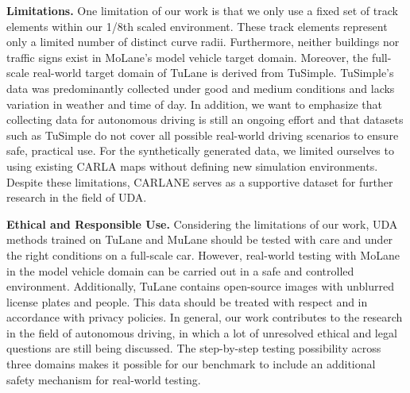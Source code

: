 \documentclass{article}
\begin{document}
	\textbf{Limitations.} One limitation of our work is that we only use a fixed set of track elements within our 1/8th scaled environment. These track elements represent only a limited number of distinct curve radii. Furthermore, neither buildings nor traffic signs exist in MoLane's model vehicle target domain.
	Moreover, the full-scale real-world target domain of TuLane is derived from TuSimple. TuSimple's data was predominantly collected under good and medium conditions and lacks variation in weather and time of day. In addition, we want to emphasize that collecting data for autonomous driving is still an ongoing effort and that datasets such as TuSimple do not cover all possible real-world driving scenarios to ensure safe, practical use. For the synthetically generated data, we limited ourselves to using existing CARLA maps without defining new simulation environments. Despite these limitations, CARLANE serves as a supportive dataset for further research in the field of UDA.
	\vspace{-2pt}
	
	\textbf{Ethical and Responsible Use.} Considering the limitations of our work, UDA methods trained on TuLane and MuLane should be tested with care and under the right conditions on a full-scale car. However, real-world testing with MoLane in the model vehicle domain can be carried out in a safe and controlled environment. Additionally, TuLane contains open-source images with unblurred license plates and people. This data should be treated with respect and in accordance with privacy policies. In general, our work contributes to the research in the field of autonomous driving, in which a lot of unresolved ethical and legal questions are still being discussed. The step-by-step testing possibility across three domains makes it possible for our benchmark to include an additional safety mechanism for real-world testing.
	
	
	
	
\newpage
	
\end{document}
